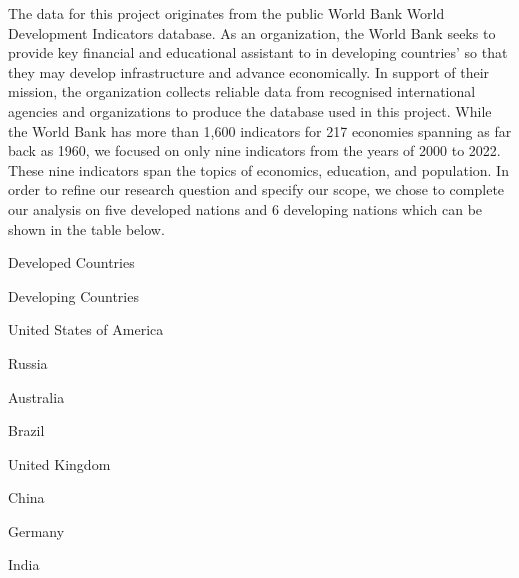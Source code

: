 \documentclass[
  letterpaper,
  DIV=11,
  numbers=noendperiod]{scrartcl}
\begin{document}
The data for this project originates from the public World Bank World
Development Indicators database. As an organization, the World Bank
seeks to provide key financial and educational assistant to in
developing countries' so that they may develop infrastructure and
advance economically. In support of their mission, the organization
collects reliable data from recognised international agencies and
organizations to produce the database used in this project. While the
World Bank has more than 1,600 indicators for 217 economies spanning as
far back as 1960, we focused on only nine indicators from the years of
2000 to 2022. These nine indicators span the topics of economics,
education, and population. In order to refine our research question and
specify our scope, we chose to complete our analysis on five developed
nations and 6 developing nations which can be shown in the table below.

\n  

\n    

\n      

Developed Countries

\n      

Developing Countries

\n    

\n  

\n  

\n    

\n      

United States of America

\n      

Russia

\n    

\n    

\n      

Australia

\n      

Brazil

\n    

\n    

\n      

United Kingdom

\n      

China

\n    

\n    

\n      

Germany

\n      

India

\n    

\n    
\end{document}
